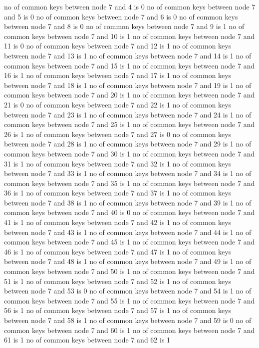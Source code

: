 no of common keys between node 7 and 4 is 0
no of common keys between node 7 and 5 is 0
no of common keys between node 7 and 6 is 0
no of common keys between node 7 and 8 is 0
no of common keys between node 7 and 9 is 1
no of common keys between node 7 and 10 is 1
no of common keys between node 7 and 11 is 0
no of common keys between node 7 and 12 is 1
no of common keys between node 7 and 13 is 1
no of common keys between node 7 and 14 is 1
no of common keys between node 7 and 15 is 1
no of common keys between node 7 and 16 is 1
no of common keys between node 7 and 17 is 1
no of common keys between node 7 and 18 is 1
no of common keys between node 7 and 19 is 1
no of common keys between node 7 and 20 is 1
no of common keys between node 7 and 21 is 0
no of common keys between node 7 and 22 is 1
no of common keys between node 7 and 23 is 1
no of common keys between node 7 and 24 is 1
no of common keys between node 7 and 25 is 1
no of common keys between node 7 and 26 is 1
no of common keys between node 7 and 27 is 0
no of common keys between node 7 and 28 is 1
no of common keys between node 7 and 29 is 1
no of common keys between node 7 and 30 is 1
no of common keys between node 7 and 31 is 1
no of common keys between node 7 and 32 is 1
no of common keys between node 7 and 33 is 1
no of common keys between node 7 and 34 is 1
no of common keys between node 7 and 35 is 1
no of common keys between node 7 and 36 is 1
no of common keys between node 7 and 37 is 1
no of common keys between node 7 and 38 is 1
no of common keys between node 7 and 39 is 1
no of common keys between node 7 and 40 is 0
no of common keys between node 7 and 41 is 1
no of common keys between node 7 and 42 is 1
no of common keys between node 7 and 43 is 1
no of common keys between node 7 and 44 is 1
no of common keys between node 7 and 45 is 1
no of common keys between node 7 and 46 is 1
no of common keys between node 7 and 47 is 1
no of common keys between node 7 and 48 is 1
no of common keys between node 7 and 49 is 1
no of common keys between node 7 and 50 is 1
no of common keys between node 7 and 51 is 1
no of common keys between node 7 and 52 is 1
no of common keys between node 7 and 53 is 0
no of common keys between node 7 and 54 is 1
no of common keys between node 7 and 55 is 1
no of common keys between node 7 and 56 is 1
no of common keys between node 7 and 57 is 1
no of common keys between node 7 and 58 is 1
no of common keys between node 7 and 59 is 0
no of common keys between node 7 and 60 is 1
no of common keys between node 7 and 61 is 1
no of common keys between node 7 and 62 is 1
